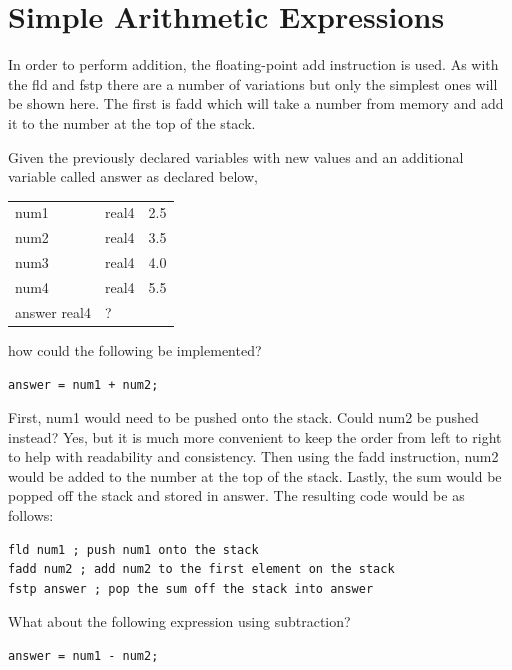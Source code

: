 \documentclass[10pt]{book}
\begin{document}
\section{Simple Arithmetic Expressions}
In order to perform addition, the floating-point add instruction is used. As with the fld and fstp there are a number of variations but only the simplest ones will be shown here. The first is fadd which will take a number from memory and add it to the number at the top of the stack.

Given the previously declared variables with new values and an additional variable called answer as declared below,

\begin{center}
\begin{tabular}{lll}
num1 & real4 & 2.5 \\

num2 & real4 & 3.5 \\
num3 & real4 & 4.0 \\
num4 & real4 & 5.5 \\
answer real4 & ? &  \\
\end{tabular}
\end{center}

how could the following be implemented?

\begin{verbatim}
answer = num1 + num2;
\end{verbatim}

First, num1 would need to be pushed onto the stack. Could num2 be pushed instead? Yes, but it is much more convenient to keep the order from left to right to help with readability and consistency. Then using the fadd instruction, num2 would be added to the number at the top of the stack. Lastly, the sum would be popped off the stack and stored in answer. The resulting code would be as follows:

\begin{verbatim}
fld num1 ; push num1 onto the stack
fadd num2 ; add num2 to the first element on the stack
fstp answer ; pop the sum off the stack into answer
\end{verbatim}

What about the following expression using subtraction?

\begin{verbatim}
answer = num1 - num2;
\end{verbatim}
\end{document}
